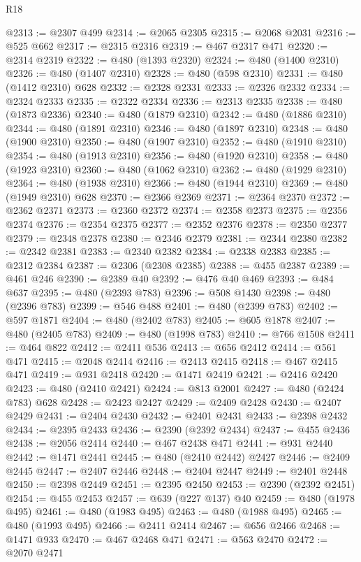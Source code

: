 \begin{lexlean}{R18}
\begin{coremodule}
@2313 := @2307 @499
@2314 := @2065 @2305
@2315 := @2068 @2031
@2316 := @525 @662
@2317 := @2315 @2316
@2319 := @467 @2317 @471
@2320 := @2314 @2319
@2322 := @480 (@1393 @2320)
@2324 := @480 (@1400 @2310)
@2326 := @480 (@1407 @2310)
@2328 := @480 (@598 @2310)
@2331 := @480 (@1412 @2310) @628
@2332 := @2328 @2331
@2333 := @2326 @2332
@2334 := @2324 @2333
@2335 := @2322 @2334
@2336 := @2313 @2335
@2338 := @480 (@1873 @2336)
@2340 := @480 (@1879 @2310)
@2342 := @480 (@1886 @2310)
@2344 := @480 (@1891 @2310)
@2346 := @480 (@1897 @2310)
@2348 := @480 (@1900 @2310)
@2350 := @480 (@1907 @2310)
@2352 := @480 (@1910 @2310)
@2354 := @480 (@1913 @2310)
@2356 := @480 (@1920 @2310)
@2358 := @480 (@1923 @2310)
@2360 := @480 (@1062 @2310)
@2362 := @480 (@1929 @2310)
@2364 := @480 (@1938 @2310)
@2366 := @480 (@1944 @2310)
@2369 := @480 (@1949 @2310) @628
@2370 := @2366 @2369
@2371 := @2364 @2370
@2372 := @2362 @2371
@2373 := @2360 @2372
@2374 := @2358 @2373
@2375 := @2356 @2374
@2376 := @2354 @2375
@2377 := @2352 @2376
@2378 := @2350 @2377
@2379 := @2348 @2378
@2380 := @2346 @2379
@2381 := @2344 @2380
@2382 := @2342 @2381
@2383 := @2340 @2382
@2384 := @2338 @2383
@2385 := @2312 @2384
@2387 := @2306 (@2308 @2385)
@2388 := @455 @2387
@2389 := @461 @246
@2390 := @2389 @40
@2392 := @476 @40 @469
@2393 := @484 @637
@2395 := @480 (@2393 @783)
@2396 := @508 @1430
@2398 := @480 (@2396 @783)
@2399 := @546 @488
@2401 := @480 (@2399 @783)
@2402 := @597 @1871
@2404 := @480 (@2402 @783)
@2405 := @605 @1878
@2407 := @480 (@2405 @783)
@2409 := @480 (@1998 @783)
@2410 := @766 @1508
@2411 := @464 @822
@2412 := @2411 @536
@2413 := @656 @2412
@2414 := @561 @471
@2415 := @2048 @2414
@2416 := @2413 @2415
@2418 := @467 @2415 @471
@2419 := @931 @2418
@2420 := @1471 @2419
@2421 := @2416 @2420
@2423 := @480 (@2410 @2421)
@2424 := @813 @2001
@2427 := @480 (@2424 @783) @628
@2428 := @2423 @2427
@2429 := @2409 @2428
@2430 := @2407 @2429
@2431 := @2404 @2430
@2432 := @2401 @2431
@2433 := @2398 @2432
@2434 := @2395 @2433
@2436 := @2390 (@2392 @2434)
@2437 := @455 @2436
@2438 := @2056 @2414
@2440 := @467 @2438 @471
@2441 := @931 @2440
@2442 := @1471 @2441
@2445 := @480 (@2410 @2442) @2427
@2446 := @2409 @2445
@2447 := @2407 @2446
@2448 := @2404 @2447
@2449 := @2401 @2448
@2450 := @2398 @2449
@2451 := @2395 @2450
@2453 := @2390 (@2392 @2451)
@2454 := @455 @2453
@2457 := @639 (@227 @137) @40
@2459 := @480 (@1978 @495)
@2461 := @480 (@1983 @495)
@2463 := @480 (@1988 @495)
@2465 := @480 (@1993 @495)
@2466 := @2411 @2414
@2467 := @656 @2466
@2468 := @1471 @933
@2470 := @467 @2468 @471
@2471 := @563 @2470
@2472 := @2070 @2471

\end{coremodule}
\end{lexlean}
